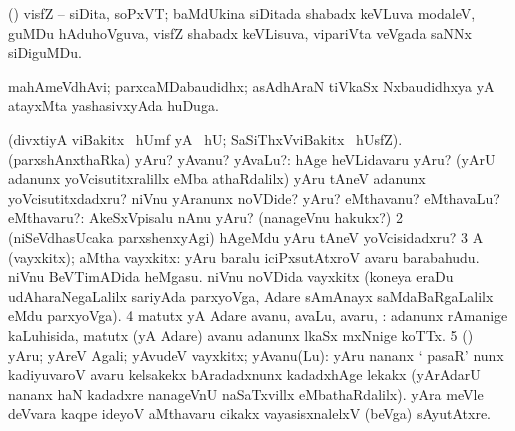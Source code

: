 {{{{{{\bentry
{}
  \gl{\nA}\bmng
(\AmA) visfZ -- siDita, soPxVT; baMdUkina siDitada shabadx keVLuva modaleV, guMDu hAduhoVguva, visfZ shabadx keVLisuva, vipariVta veVgada saNNx siDiguMDu. 
\emng
\eentry

\bentry
{}
  \gl{\nA}\bmng
mahAmeVdhAvi; parxcaMDabaudidhx; asAdhAraN tiVkaSx Nxbaudidhxya yA atayxMta yashasivxyAda huDuga. 
\emng
\eentry

\bentry
{} 
\gl{\nA}
\expl{}
\bmng
{} 
\emng
\eentry

\bentry
{} 
\gl{\akirx}
\bmng
{} 
\emng
\eentry

\bentry
{}
\gl{\saMkiSx}
\expl{}
\bmng
{} 
\emng
\eentry

\bentry
{} 
\gl{\sanA}
\expl{}
\bmng
(divxtiyA viBakitx  \ucAcx\ hUmf yA \AmA {} \ucAcx\ hU; SaSiThxVviBakitx  \ucAcx\ hUsfZ). 
\bnum
{} (parxshAnxthaRka) 
\banum
{} yAru? yAvanu? yAvaLu?:  hAge heVLidavaru yAru?  (yArU adanunx yoVcisutitxralillx eMba athaRdalilx) yAru tAneV adanunx yoVcisutitxdadxru?  niVnu yAranunx noVDide? 
 yAru? eMthavanu? eMthavaLu? eMthavaru?:  AkeSxVpisalu nAnu yAru? (nanageVnu hakukx?) 
\eanum
\numie
\num{2} (niSeVdhasUcaka parxshenxyAgi)  hAgeMdu yAru tAneV yoVcisidadxru? 
\num{3} A (vayxkitx); aMtha vayxkitx:  yAru baralu iciPxsutAtxroV avaru barabahudu.  niVnu BeVTimADida heMgasu.  niVnu noVDida vayxkitx (koneya eraDu udAharaNegaLalilx  sariyAda parxyoVga, Adare sAmAnayx saMdaBaRgaLalilx  eMdu parxyoVga). 
\num{4} matutx yA Adare avanu, avaLu, avaru, \mo:  adanunx rAmanige kaLuhisida, matutx (yA Adare) avanu adanunx lkaSx mxNnige koTTx. 
\num{5} (\pArxparx) yAru; yAreV Agali; yAvudeV vayxkitx; yAvanu(Lu):  yAru nananx ` pasaR' nunx kadiyuvaroV avaru kelsakekx bAradadxnunx kadadxhAge lekakx (yArAdarU nananx haN kadadxre nanageVnU naSaTxvillx eMbathaRdalilx).  yAra meVle deVvara kaqpe ideyoV aMthavaru cikakx vayasisxnalelxV (beVga) sAyutAtxre. 
\enum
\emng

}}}}}}
